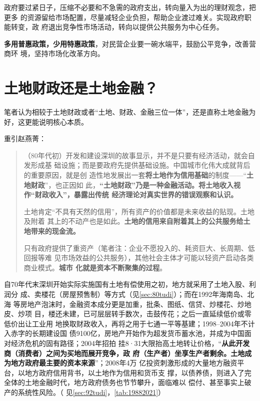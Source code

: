 政府要过紧日子，压缩不必要和不急需的政府支出，转向量入为出的理财观念，把更多
的资源留给市场配置，尽量减轻企业负担，帮助企业渡过难关。实现政府职能转变，政
府退出竞争性市场活动，转向以提供公共服务为中心任务。

\textbf{多用普惠政策，少用特惠政策}，对民营企业要一碗水端平，鼓励公平竞争，改善营商环
境，坚持市场化改革方向。


\section{土地财政还是土地金融？}

笔者认为相较于土地财政或者“土地、财政、金融三位一体”，还是直称土地金融为
好，这更能说明核心本质。

重引赵燕菁：
\begin{quotation}
  （80年代初）开发和建设深圳的故事显示，并不是只要有经济活动，就会自发形成基
  础设施；而是要政府先提供基础设施。中国城市化伟大成就背后的重要原因，就是创
  造性地发展出一套\textbf{将土地作为信用基础}的制度——“\textbf{土地财政}”，也正因如
  此，\textbf{“土地财政”乃是一种金融活动。将土地收入视作“财政收入”，暴露出传统
    经济理论对真实世界的错误观察和认识。}

  土地肯定“不具有天然的信用”，所有资产的价值都是未来收益的贴现。土地及附着
  其上的不动产也是如此。\textbf{土地的信用来自附着其上的公共服务给土地带来的现金流。}

  只有政府提供了重资产（笔者注：企业不愿投入的、耗资巨大、长周期、低回报等难
  见市场效益的公共服务），其他社会主体才可能以轻资产启动各类商业模式。\textbf{城市
    化就是资本不断聚集的过程}。
\end{quotation}

自70年代末深圳开始实际实施国有土地有偿使用之初，地方就采用了土地入股、利润分
成、卖楼花（房屋预售制）等方式（见\cref{sec:80tudi}）；而在1992年海南岛、北海
等房地产泡沫时，金融资本成分更是加重，批条、图纸、信贷、炒楼花、炒地皮、炒项
目，楼还未建，已可层层转手数次，击鼓传花；之后一直延续低价或零低价出让工业用
地换取财政收入，再将之用于七通一平等基建；1998--2004年不计入赤字的长期建设国
债9100亿，房地产开始作为超发货币蓄水池，并成为中国面对经济危机的固有路径；2004年招拍
挂8·31大限抬高土地转让价格，“\textbf{从此开发商（消费者）之间为买地而展开竞争，政
  府（生产者）坐享生产者剩余。土地成为地方政府最主要的资本来源}”；2008年4万
亿投资刺激形成的大量地方融资平台，以地方政府信用背书，以土地作为信用和货币支
撑，以债养债，则进入了完全体的土地金融时代，地方政府债务也节节攀升，面临难以
偿付、甚至事实上破产的系统性风险。（
见\cref{sec:92tudi}，\cref{tab:19882021}）


